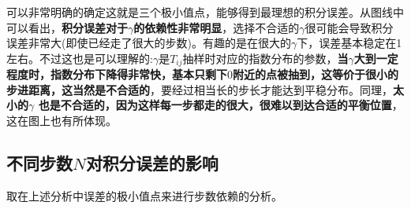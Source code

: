 \documentclass[UTF8]{ctexart}
\begin{document}
\begin{flushleft}
		可以非常明确的确定这就是三个极小值点，能够得到最理想的积分误差。从图线中可以看出，\textbf{积分误差对于$\gamma$的依赖性非常明显}，选择不合适的$\gamma$很可能会导致积分误差非常大(即使已经走了很大的步数)。有趣的是在很大的$\gamma$下，误差基本稳定在1左右。不过这也是可以理解的:$\gamma$是$T_{ij}$抽样时对应的指数分布的参数，\textbf{当$\gamma$大到一定程度时，指数分布下降得非常快，基本只剩下$0$附近的点被抽到，这等价于很小的步进距离，这当然是不合适的}，要经过相当长的步长才能达到平稳分布。同理，\textbf{太小的$\gamma$	也是不合适的，因为这样每一步都走的很大，很难以到达合适的平衡位置}，这在图上也有所体现。
	\end{flushleft}
	
	
	\subsection{不同步数$N$对积分误差的影响}
	
	取在上述分析中误差的极小值点来进行步数依赖的分析。
	
\end{document}

